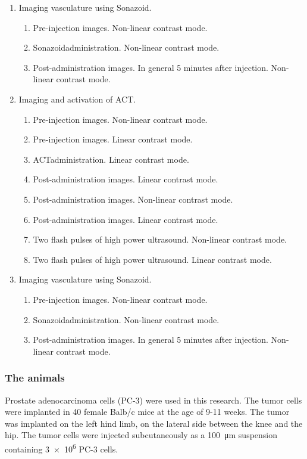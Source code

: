 \begin{enumerate}
	\item Imaging vasculature using Sonazoid\texttrademark.
		\begin{enumerate}
		\item Pre-injection images. Non-linear contrast mode.
		\item Sonazoid\texttrademark administration. Non-linear contrast mode.
		\item Post-administration images. In general 5 minutes after injection. Non-linear contrast mode.
		\end{enumerate}
	\item Imaging and activation of ACT\textregistered.
		\begin{enumerate}
		\item Pre-injection images. Non-linear contrast mode.
		\item Pre-injection images. Linear contrast mode.
		\item ACT\textregistered administration. Linear contrast mode.
		\item Post-administration images. Linear contrast mode.
		\item Post-administration images. Non-linear contrast mode.
		\item Post-administration images. Linear contrast mode.
		\item Two flash pulses of high power ultrasound. Non-linear contrast mode.
		\item Two flash pulses of high power ultrasound. Linear contrast mode.
		\end{enumerate}
	\item Imaging vasculature using Sonazoid\texttrademark.
		\begin{enumerate}
		\item Pre-injection images. Non-linear contrast mode.
		\item Sonazoid\texttrademark administration. Non-linear contrast mode.
		\item Post-administration images. In general 5 minutes after injection. Non-linear contrast mode.
		\end{enumerate}
\end{enumerate}  
 

\subsubsection{The animals}
Prostate adenocarcinoma cells (PC-3) were used in this research. The tumor cells were implanted in 40 female Balb/c mice at the age of 9-11 weeks. The tumor was implanted on the left hind limb, on the lateral side between the knee and the hip. The tumor cells were injected subcutaneously as a \SI{100}{\micro\meter} suspension containing \num{3e6} PC-3 cells.

